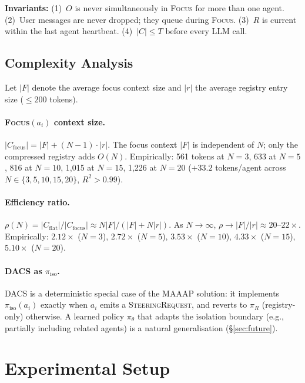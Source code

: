 \documentclass{article}
\begin{document}
\noindent\textbf{Invariants:}
(1)~$O$ is never simultaneously in \textsc{Focus} for more than one agent.
(2)~User messages are never dropped; they queue during \textsc{Focus}.
(3)~$R$ is current within the last agent heartbeat.
(4)~$|C| \leq T$ before every LLM call.

\subsection{Complexity Analysis}
\label{sec:complexity}

Let $|F|$ denote the average focus context size and $|r|$ the average
registry entry size ($\leq 200$ tokens).

\paragraph{\textsc{Focus}$(a_i)$ context size.}
$|C_{\text{focus}}| = |F| + (N-1) \cdot |r|$.
The focus context $|F|$ is independent of $N$;
only the compressed registry adds $O(N)$.
Empirically: 561 tokens at $N{=}3$, 633 at $N{=}5$, 816 at $N{=}10$,
1{,}015 at $N{=}15$, 1{,}226 at $N{=}20$
($+33.2$ tokens/agent across $N\in\{3,5,10,15,20\}$, $R^2 > 0.99$).

\paragraph{Efficiency ratio.}
$\rho(N) = |C_{\text{flat}}| / |C_{\text{focus}}| \approx N|F| / (|F| +
N|r|)$.
As $N \to \infty$, $\rho \to |F| / |r| \approx 20$--$22\times$.
Empirically: $2.12\times$ ($N{=}3$), $2.72\times$ ($N{=}5$),
$3.53\times$ ($N{=}10$), $4.33\times$ ($N{=}15$), $5.10\times$ ($N{=}20$).

\paragraph{DACS as $\pi_{\text{iso}}$.}
DACS is a deterministic special case of the MAAAP solution: it
implements $\pi_{\text{iso}}(a_i)$ exactly when $a_i$ emits a
\textsc{SteeringRequest}, and reverts to $\pi_R$ (registry-only)
otherwise.
A learned policy $\pi_\theta$ that adapts the isolation boundary
(e.g., partially including related agents) is a natural generalisation
(\S\ref{sec:future}).

\section{Experimental Setup}
\label{sec:experiments}
\end{document}
